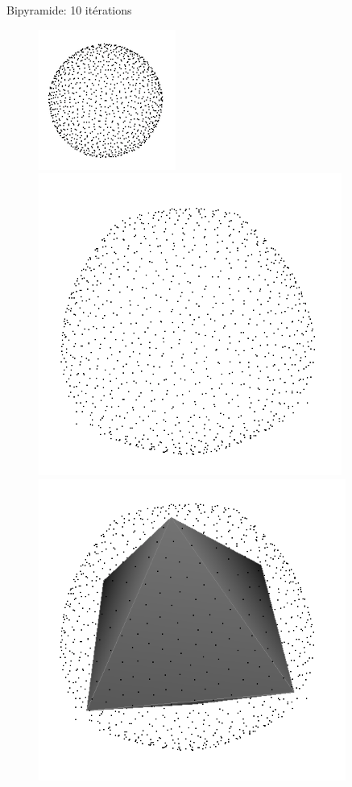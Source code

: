 \documentclass{beamer}
\begin{document}
\begin{frame}
    Bipyramide: 10 itérations
    \begin{figure}
        \centering
        \includegraphics[scale=0.4]{img/sphere-cube-0}
        \includegraphics[scale=0.2]{img/sphere-bipyramid-10}
        \includegraphics[scale=0.2]{img/sphere-bipyramid-bipyramid}
    \end{figure}
\end{frame}
\end{document}
